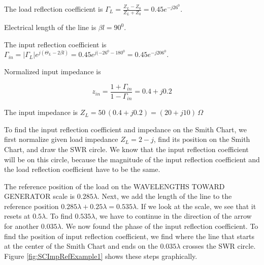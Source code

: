 \documentclass{ximera}
\begin{document}
\begin{example}
\begin{explanation}
The load reflection coefficient  is  $\Gamma_{L}=\frac{Z_L-Z_0}{Z_L+Z_0} =0.45 e^{-j 26^0 }$. 

Electrical length of the line is $\beta l =90^0$. 

The input reflection coefficient is $\Gamma_{in} = |\Gamma_L| e^{j(\Theta_{L} -2 \beta l) } =0.45 e^{j(-26^0 -180^0 }=0.45 e^{-j206^0} $.

Normalized input impedance is 

\begin{equation}
z_{in}=\frac{1+\Gamma_{in}}{1-\Gamma_{in}} = 0.4+ j 0.2
\end{equation}

The input impedance is $Z_L=50 \, (0.4 + j 0.2)= (20 + j 10) \, \Omega$


To find the input reflection coefficient and impedance on the Smith Chart, we first normalize given load impedance 
$Z_L=2-j$,  find its position on the Smith Chart, and draw the SWR circle. We know that the input reflection coefficient will be on this circle, because the magnitude of the input reflection coefficient and the load reflection coefficient have to be the same.

The reference position of the load on the WAVELENGTHS TOWARD GENERATOR scale is $0.285 \lambda$. Next, we add the length of the line to the reference position $0.285 \lambda + 0.25 \lambda = 0.535 \lambda$. If we look at the scale, we see that it resets at $0.5 \lambda$. To find $0.535 \lambda$, we have to continue in the direction of the arrow for another $0.035 \lambda$. We now found the phase of the input reflection coefficient. To find the position of input reflection coefficient, we find where the line that starts at the center of the Smith Chart and ends on the $0.035 \lambda$ crosses the SWR circle. Figure \ref{fig:SCImpRefExample1} shows these steps graphically.


\end{explanation}
\end{example}
\end{document}
